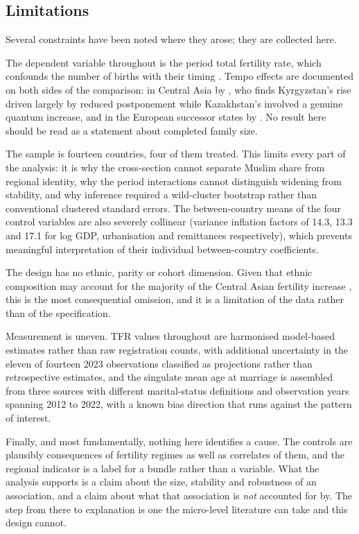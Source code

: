 \subsection{Limitations}
\label{sec:limitations}

Several constraints have been noted where they arose; they are collected here.

The dependent variable throughout is the period total fertility rate, which confounds the number of births with their timing \parencite{bongaarts1998}. Tempo effects are documented on both sides of the comparison: in Central Asia by \textcite{spoorenberg2015}, who finds Kyrgyzstan's rise driven largely by reduced postponement while Kazakhstan's involved a genuine quantum increase, and in the European successor states by \textcite{grigoras2019}. No result here should be read as a statement about completed family size.

The sample is fourteen countries, four of them treated. This limits every part of the analysis: it is why the cross-section cannot separate Muslim share from regional identity, why the period interactions cannot distinguish widening from stability, and why inference required a wild-cluster bootstrap rather than conventional clustered standard errors. The between-country means of the four control variables are also severely collinear (variance inflation factors of 14.3, 13.3 and 17.1 for log GDP, urbanisation and remittances respectively), which prevents meaningful interpretation of their individual between-country coefficients.

The design has no ethnic, parity or cohort dimension. Given that ethnic composition may account for the majority of the Central Asian fertility increase \parencite{spoorenberg2015}, this is the most consequential omission, and it is a limitation of the data rather than of the specification.

Measurement is uneven. TFR values throughout are harmonised model-based estimates rather than raw registration counts, with additional uncertainty in the eleven of fourteen 2023 observations classified as projections rather than retrospective estimates, and the singulate mean age at marriage is assembled from three sources with different marital-status definitions and observation years spanning 2012 to 2022, with a known bias direction that runs against the pattern of interest.

Finally, and most fundamentally, nothing here identifies a cause. The controls are plausibly consequences of fertility regimes as well as correlates of them, and the regional indicator is a label for a bundle rather than a variable. What the analysis supports is a claim about the size, stability and robustness of an association, and a claim about what that association is \emph{not} accounted for by. The step from there to explanation is one the micro-level literature can take and this design cannot.
